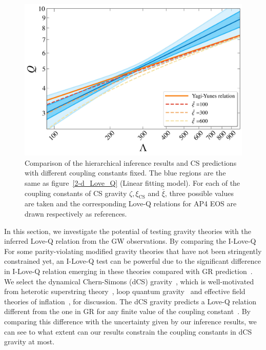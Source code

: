 \documentclass[a4paper,11pt]{article}
\begin{document}
\begin{figure}[htbp]
\begin{minipage}{0.48\linewidth}
    \end{minipage}
    \vspace{3mm}
    \begin{minipage}{0.48\linewidth}
        \includegraphics[width=\linewidth]{CS_xi_bar_AP4_2d.pdf}
    \end{minipage}
    \caption{Comparison of the hierarchical inference results and CS predictions with different coupling constants fixed. The blue regions are the same as figure~\ref{2-d_Love_Q} (Linear fitting model). For each of the coupling constants of CS gravity $\zeta, \xi_{\mathrm{CS}}$ and $\bar\xi$, three possible values are taken and the corresponding Love-Q relations for AP4 EOS are drawn respectively as references.}
    \label{cs_Love_Q}
\end{figure}
In this section, we investigate the potential of testing gravity theories with
the inferred Love-Q relation from the GW observations.
By comparing the I-Love-Q 
For some parity-violating modified gravity theories that have not been stringently constrained yet, an I-Love-Q test can be powerful due to the significant difference in I-Love-Q relation emerging in these theories compared with GR prediction~\cite{Yagi_2017, Yunes:2025xwp}. We select the dynamical Chern-Simons (dCS) gravity~\cite{Jackiw:2003pm, Smith:2007jm, Alexander:2009tp}, which is well-motivated from heterotic superstring theory~\cite{Polchinski:1998rq, Polchinski:1998rr}, loop quantum gravity~\cite{Alexander:2004xd, Taveras:2008yf, Calcagni:2009xz} and effective field theories of inflation~\cite{Weinberg:2008hq}, for discussion. The dCS gravity predicts a Love-Q relation different from the one in GR for any finite value of the coupling constant~\cite{Yagi:2013bca, Yagi:2013awa, Gupta:2017vsl}. By comparing this difference with the uncertainty given by our inference results, we can see to what extent can our results constrain the coupling constants in dCS gravity at most. 
\end{document}
